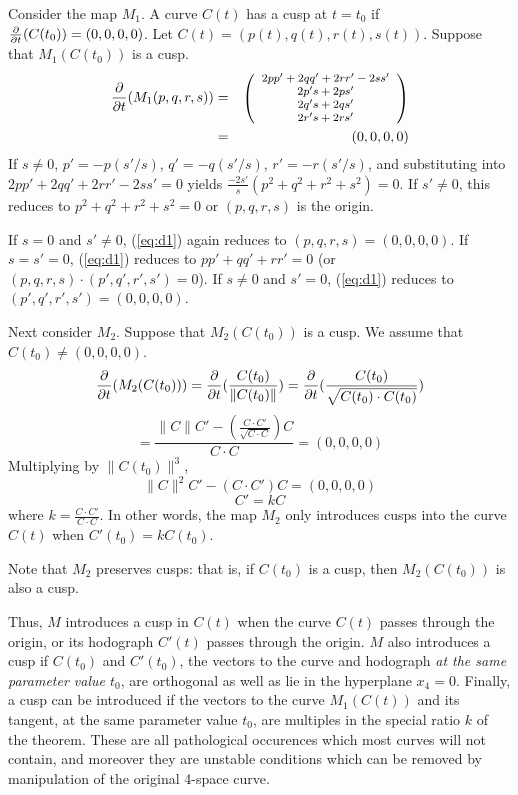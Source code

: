 Consider the map $M_1$.
A curve $C(t)$ has a cusp at $t=t_0$ if $\frac{\partial}{\partial t}(C(t_0)) = (0,0,0,0)$.
Let $C(t) = (p(t),q(t),r(t),s(t))$.
Suppose that $M_1(C(t_0))$ is a cusp.
\begin{eqnarray}
\label{eq:d1}
\frac{\partial}{\partial t}(M_1(p,q,r,s)) & = & 
\mbox{\footnotesize{$\left( \begin{array}{c}
	2pp' + 2qq' + 2rr'  - 2ss' \\
	2p's + 2ps' \\
	2q's + 2qs' \\
        2r's + 2rs' 
\end{array} \right)$}} \nonumber \\
& = & (0,0,0,0)
\end{eqnarray}
If $s \neq 0$,
$       p' = -p(s'/s)$,
$       q' = -q(s'/s)$,
$       r' = -r(s'/s)$,
and substituting into $2pp' + 2qq' + 2rr'  - 2ss' = 0$ yields
$        \frac{-2s'}{s}(p^2+q^2+r^2+s^2) = 0 $.
If $s'\neq 0$, this reduces to
$ p^2 + q^2 + r^2 + s^2 = 0$
or $(p,q,r,s)$ is the origin.

If $s = 0$ and $s' \neq 0$,
(\ref{eq:d1}) again reduces to $(p,q,r,s) = (0,0,0,0)$.
If $s = s' = 0$,
(\ref{eq:d1}) reduces to $pp' + qq' + rr' = 0$ 
(or $(p,q,r,s) \cdot (p',q',r',s') = 0$).
If $s \neq 0$ and $s' = 0$,
(\ref{eq:d1}) reduces to $(p',q',r',s') = (0,0,0,0)$.

Next consider $M_2$.
Suppose that $M_2(C(t_0))$ is a cusp.
We assume that $C(t_0) \neq (0,0,0,0)$.
\[ 
\frac{\partial}{\partial t}(M_2(C(t_0))) 
= \frac{\partial}{\partial t}(\frac{C(t_0)}{\|C(t_0)\|})
= \frac{\partial}{\partial t}(\frac{C(t_0)}{\sqrt{C(t_0) \cdot C(t_0)}})
\]
\[
= \frac{\|C\| C' - (\frac{C \cdot C'}{\sqrt{C \cdot C}}) C}{C \cdot C}
= (0,0,0,0)
\]
Multiplying by $\|C(t_0)\|^3$,
\[
\|C\|^2 C' - (C \cdot C') C = (0,0,0,0)
\]
\[
C' = kC
\]
where $k = \frac{C \cdot C'}{C \cdot C}$.
In other words,
the map $M_2$ only introduces cusps into the curve $C(t)$ when
$C'(t_0) = kC(t_0)$.

Note that $M_2$ preserves cusps: that is, if $C(t_0)$ is a cusp,
then $M_2(C(t_0))$ is also a cusp.
\QED

Thus, $M$ introduces a cusp in $C(t)$
when the curve $C(t)$ passes through
the origin, or its hodograph $C'(t)$ passes through the origin.
$M$ also introduces a cusp if $C(t_0)$ and $C'(t_0)$, 
the vectors to the curve and hodograph {\em at the same parameter value
$t_0$}, are orthogonal as well as lie in the hyperplane $x_4=0$.
Finally, a cusp can be introduced if the vectors to the
curve $M_1(C(t))$ and its tangent, at the same parameter value $t_0$, 
are multiples in the special ratio $k$ of the theorem.
These are all pathological occurences which most curves will not
contain, and moreover they are unstable conditions which can be
removed by manipulation of the original 4-space curve.


